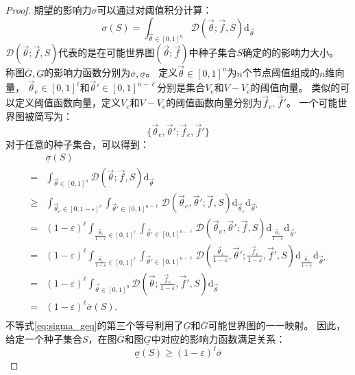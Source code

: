 \begin{proof}
期望的影响力$\sigma$可以通过对阈值积分计算：
$$\sigma(S)=\int_{\vec{\theta}\in[0,1]^n} \mathcal{D}(\vec{\theta};\vec{f},S) \mbox{d}_{\vec{\theta}}$$
$\mathcal{D}(\vec{\theta};\vec{f},S)$代表的是在可能世界图$(\vec{\theta};\vec{f})$中种子集合$S$确定的的影响力大小。
称图$\overline{G},\underline{G}$的影响力函数分别为$\overline{\sigma},\underline{\sigma}$。
定义$\vec{\theta}\in[0,1]^n$为$n$个节点阈值组成的$n$维向量，
$\vec{\theta}_e \in[0,1]^{\ell}$和$\vec{\theta}'\in[0,1]^{n-\ell}$分别是集合$V_e$和$V-V_e$的阈值向量。
类似的可以定义阈值函数向量，定义$V_e$和$V-V_e$的阈值函数向量分别为$\vec{f}_e,\vec{f}'$。
一个可能世界图被简写为：
$$\{\vec{\theta}_e,\vec{\theta}';\vec{f}_e,\vec{f}'\}$$
对于任意的种子集合，可以得到：
\begin{equation}
\label{eq:sigma_geq}
\begin{array}{ll}
&\underline{\sigma}(S)\\
=&\int_{\vec{\theta}\in[0,1]^n} \mathcal{D}(\vec{\theta};\vec{f},S) \mbox{d}_{\vec{\theta}} \\
\geq&\int_{\vec{\theta}_e\in[0,1-\varepsilon]^{\ell}}\int_{\vec{\theta}'\in[0,1]^{n-\ell}} \mathcal{D}(\vec{\theta}_e,\vec{\theta}';\vec{f},S) \mbox{d}_{\vec{\theta}_e}\mbox{d}_{\vec{\theta}'} \\
=&(1-\varepsilon)^{\ell} \int_{\frac{\vec{\theta}_e}{1-\varepsilon}\in[0,1]^{\ell}}\int_{\vec{\theta}'\in[0,1]^{n-\ell}} \mathcal{D}(\vec{\theta}_e,\vec{\theta}';\vec{f},S) \mbox{d}_{\frac{\vec{\theta}_e}{1-\varepsilon}}\mbox{d}_{\vec{\theta}'} \\
=&(1-\varepsilon)^{\ell} \int_{\frac{\vec{\theta}_e}{1-\varepsilon}\in[0,1]^{\ell}}\int_{\vec{\theta}'\in[0,1]^{n-\ell}} \mathcal{D}(\frac{\vec{\theta}_e}{1-\varepsilon},\vec{\theta}';\frac{\vec{f}_e}{1-\varepsilon},\vec{f}',S) \mbox{d}_{\frac{\vec{\theta}_e}{1-\varepsilon}}\mbox{d}_{\vec{\theta}'} \\
=&(1-\varepsilon)^{\ell} \int_{\vec{\theta}\in[0,1]^n} \mathcal{D}(\vec{\theta};\frac{\vec{f}_e}{1-\varepsilon},\vec{f}',S) \mbox{d}_{\vec{\theta}} \\
=&(1-\varepsilon)^{\ell} \overline{\sigma}(S).\\
\end{array}
\end{equation}
不等式\ref{eq:sigma_geq}的第三个等号利用了$\underline{G}$和$\overline{G}$可能世界图的一一映射。
因此，给定一个种子集合$S$，在图$\overline{G}$和图$\underline{G}$中对应的影响力函数满足关系：
$$\underline{\sigma}(S) \geq (1-\varepsilon)^{\ell} \overline{\sigma}$$




\end{proof}

